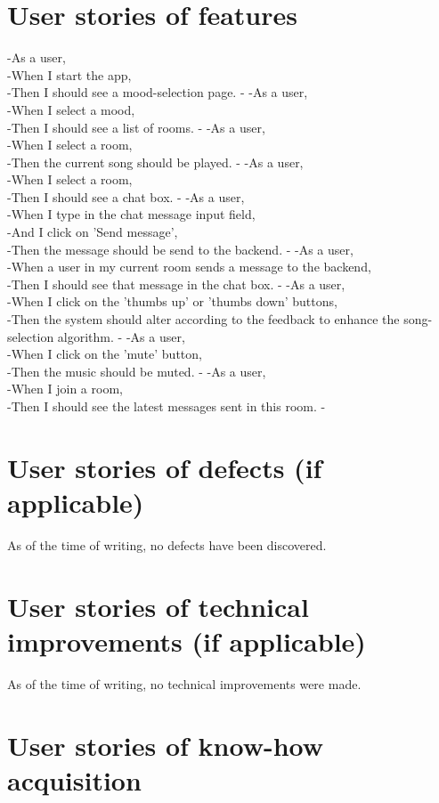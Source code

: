 \section{User stories of features}
-As a user,\\
-When I start the app,\\
-Then I should see a mood-selection page.
-
-As a user,\\
-When I select a mood,\\
-Then I should see a list of rooms.
-
-As a user,\\
-When I select a room,\\
-Then the current song should be played.
-
-As a user,\\
-When I select a room,\\
-Then I should see a chat box.
-
-As a user,\\
-When I type in the chat message input field,\\
-And I click on 'Send message',\\
-Then the message should be send to the backend.
-
-As a user,\\
-When a user in my current room sends a message to the backend,\\
-Then I should see that message in the chat box.
-
-As a user,\\
-When I click on the 'thumbs up' or 'thumbs down' buttons,\\
-Then the system should alter according to the feedback to enhance the song-selection algorithm.
-
-As a user,\\
-When I click on the 'mute' button,\\
-Then the music should be muted.
-
-As a user,\\
-When I join a room,\\
-Then I should see the latest messages sent in this room.
-
\section{User stories of defects (if applicable)}
As of the time of writing, no defects have been discovered.

\section{User stories of technical improvements (if applicable)}
As of the time of writing, no technical improvements were made.

\section{User stories of know-how acquisition}

